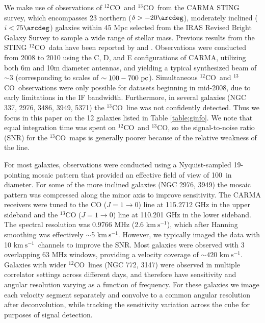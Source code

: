 \documentclass{emulateapj}
\def\ttco{\mbox{$^{13}$CO}}
\def\twco{\mbox{$^{12}$CO}}
\newcommand{\kms}{$\mathrm{km~s^{-1}}$}
\begin{document}
We make use of observations of \twco \ and \ttco \ from the CARMA STING survey, 
which encompasses 23 northern ($\delta > -20\arcdeg$), moderately inclined ($i < 75\arcdeg$) galaxies 
within 45 Mpc selected from the IRAS Revised Bright Galaxy Survey \citep{Sanders2003} 
to sample a wide range of stellar mass.  Previous results from the STING \twco\ data 
have been reported by \citet{Rahman2011,Rahman2012} and \citet{Wong2013}. 
Observations were conducted from 2008 to 2010 using the C, D, and E configurations of CARMA, 
utilizing both 6m and 10m diameter antennas, and yielding a typical
synthesized beam of $\sim$3 
(corresponding to scales of $\sim 100 - 700 \rm \ pc $).  
Simultaneous \twco\ and \ttco\ observations were only possible for datasets beginning in mid-2008, 
due to early limitations in the IF bandwidth.  
Furthermore, in several galaxies (NGC 337, 2976, 3486, 3949, 5371) the \ttco\ line was not confidently detected. 
Thus we focus in this paper on the 12 galaxies listed in Table \ref{table:ginfo}. 
We note that equal integration time was spent on \twco\ and \ttco, so the signal-to-noise ratio (SNR) for 
the \ttco\ maps is generally poorer because of the relative weakness of the line.

For most galaxies, observations were conducted using a Nyquist-sampled 19-pointing mosaic pattern 
that provided an effective field of view of 100\arcsec\ in diameter.
For some of the more inclined galaxies (NGC 2976, 3949) the mosaic pattern was compressed along 
the minor axis to improve sensitivity.  
The CARMA receivers were tuned to the CO ($J = 1 \rightarrow 0$) line at 115.2712 GHz 
in the upper sideband and the $^{13}$CO ($J = 1 \rightarrow 0$) line at 110.201 GHz in the lower sideband. 
The spectral resolution was 0.9766 MHz (2.6 \kms), which after Hanning smoothing was effectively $\sim$5 \kms.
However, we typically imaged the data with 10 \kms\ channels to improve the SNR. 
Most galaxies were observed with 3 overlapping 63 MHz windows,
providing a velocity coverage of $\sim 420$ \kms. 
Galaxies with wider \twco \  lines (NGC 772, 3147) were observed in multiple correlator settings across different days,
and therefore have sensitivity and angular resolution varying as a
function of frequency. 
For these galaxies we image each velocity segment separately and
convolve to a common angular resolution 
after deconvolution, while tracking the sensitivity variation 
across the cube for purposes of signal detection.
\end{document}
